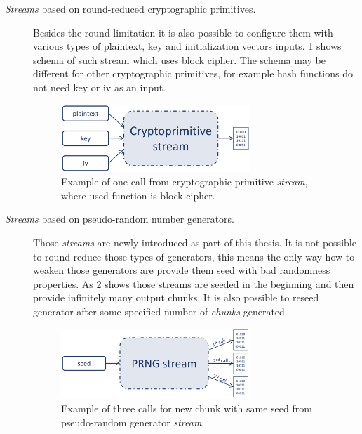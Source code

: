 \documentclass[
    digital,    %
    oneside,    %
    color,
    11pt,
    nocover,
    notable,
    nolof,
    nolot,
    final
]{fithesis3}
\begin{document}
\begin{description}
	\item[\textit{Streams} based on round-reduced cryptographic primitives.] Besides the round limitation it is also possible to configure them with various types of plaintext, key and initialization vectors inputs. \cref{fig:crypto-stream} shows schema of such stream which uses block cipher. The schema may be different for other cryptographic primitives, for example hash functions do not need key or iv as an input.
	
	\begin{figure}[h]
		\centering
		\includegraphics[width=0.7\textwidth]{./images/pictures/cryptoprimitive-stream.png}
		\caption{Example of one call from cryptographic primitive \textit{stream}, where used function is block cipher.}
		\label{fig:crypto-stream}
	\end{figure}
	
	\item[\textit{Streams} based on pseudo-random number generators.] Those \textit{streams} are newly introduced as part of this thesis. It is not possible to round-reduce those types of generators, this means the only way how to weaken those generators are provide them seed with bad randomness properties. As \cref{fig:prng-streams} shows those streams are seeded in the beginning and then provide infinitely many output chunks. It is also possible to reseed generator after some specified number of \textit{chunks} generated.
	
	\begin{figure}[h]
		\centering
		\includegraphics[width=0.7\textwidth]{./images/pictures/prng-stream.png}
		\caption{Example of three calls for new chunk with same seed from pseudo-random generator \textit{stream}.}
		\label{fig:prng-streams}
	\end{figure}
	
\end{description}
\end{document}
